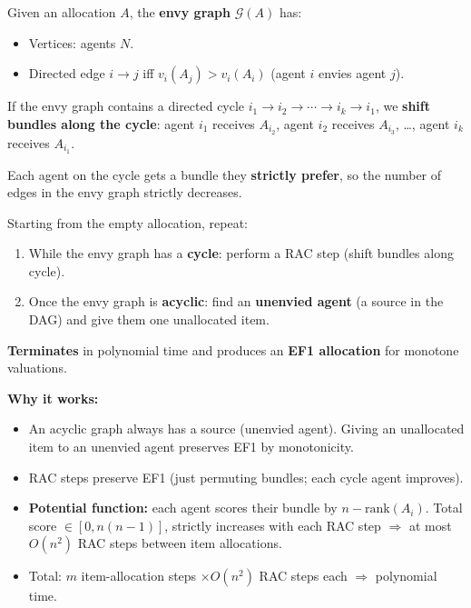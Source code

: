 \begin{defbox}
Given an allocation $A$, the \textbf{envy graph} $\mathcal{G}(A)$ has:
\begin{itemize}
  \item Vertices: agents $N$.
  \item Directed edge $i \to j$ iff $v_i(A_j) > v_i(A_i)$ (agent $i$ envies agent $j$).
\end{itemize}
\end{defbox}

\begin{defbox}
If the envy graph contains a directed cycle $i_1 \to i_2 \to \cdots \to i_k \to i_1$, we \textbf{shift bundles along the cycle}: agent $i_1$ receives $A_{i_2}$, agent $i_2$ receives $A_{i_3}$, \ldots, agent $i_k$ receives $A_{i_1}$.

Each agent on the cycle gets a bundle they \textbf{strictly prefer}, so the number of edges in the envy graph strictly decreases.
\end{defbox}

\begin{thmbox}
Starting from the empty allocation, repeat:
\begin{enumerate}
  \item While the envy graph has a \textbf{cycle}: perform a RAC step (shift bundles along cycle).
  \item Once the envy graph is \textbf{acyclic}: find an \textbf{unenvied agent} (a source in the DAG) and give them one unallocated item.
\end{enumerate}
\textbf{Terminates} in polynomial time and produces an \textbf{EF1 allocation} for monotone valuations.
\end{thmbox}

\textbf{Why it works:}
\begin{itemize}
  \item An acyclic graph always has a source (unenvied agent). Giving an unallocated item to an unenvied agent preserves EF1 by monotonicity.
  \item RAC steps preserve EF1 (just permuting bundles; each cycle agent improves).
  \item \textbf{Potential function:} each agent scores their bundle by $n - \text{rank}(A_i)$. Total score $\in [0, n(n-1)]$, strictly increases with each RAC step $\Rightarrow$ at most $O(n^2)$ RAC steps between item allocations.
  \item Total: $m$ item-allocation steps $\times O(n^2)$ RAC steps each $\Rightarrow$ polynomial time.
\end{itemize}

